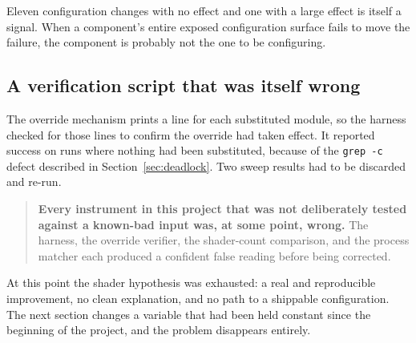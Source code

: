 Eleven configuration changes with no effect and one with a large effect is itself
a signal. When a component's entire exposed configuration surface fails to move
the failure, the component is probably not the one to be configuring.

\subsection{A verification script that was itself wrong}

The override mechanism prints a line for each substituted module, so the harness
checked for those lines to confirm the override had taken effect. It reported
success on runs where nothing had been substituted, because of the \verb|grep -c|
defect described in Section~\ref{sec:deadlock}. Two sweep results had to be
discarded and re-run.

\begin{quote}
\textbf{Every instrument in this project that was not deliberately tested against
a known-bad input was, at some point, wrong.} The harness, the override
verifier, the shader-count comparison, and the process matcher each produced a
confident false reading before being corrected.
\end{quote}

At this point the shader hypothesis was exhausted: a real and reproducible
improvement, no clean explanation, and no path to a shippable configuration. The
next section changes a variable that had been held constant since the beginning
of the project, and the problem disappears entirely.
